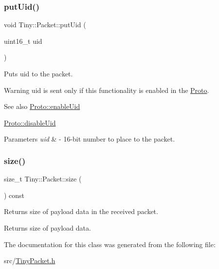 \subsubsection{\texorpdfstring{put\+Uid()}{putUid()}}
{\footnotesize\ttfamily void Tiny\+::\+Packet\+::put\+Uid (\begin{DoxyParamCaption}\item[{uint16\+\_\+t}]{uid }\end{DoxyParamCaption})\hspace{0.3cm}{\ttfamily [inline]}}

Puts uid to the packet. \begin{DoxyWarning}{Warning}
uid is sent only if this functionality is enabled in the \hyperlink{classTiny_1_1Proto}{Proto}. 
\end{DoxyWarning}
\begin{DoxySeeAlso}{See also}
\hyperlink{classTiny_1_1Proto_a9fdd64b8296e27f3205cd0d3ea685eac}{Proto\+::enable\+Uid} 

\hyperlink{classTiny_1_1Proto_aff9f3c59f58a8ca527ad0254ab806c5c}{Proto\+::disable\+Uid} 
\end{DoxySeeAlso}

\begin{DoxyParams}{Parameters}
{\em uid} & -\/ 16-\/bit number to place to the packet. \\
\hline
\end{DoxyParams}
\mbox{\label{classTiny_1_1Packet_a47c24d500159d2268908b10c407d8d4d}} 
\subsubsection{\texorpdfstring{size()}{size()}}
{\footnotesize\ttfamily size\+\_\+t Tiny\+::\+Packet\+::size (\begin{DoxyParamCaption}{ }\end{DoxyParamCaption}) const\hspace{0.3cm}{\ttfamily [inline]}}

Returns size of payload data in the received packet. \begin{DoxyReturn}{Returns}
size of payload data. 
\end{DoxyReturn}


The documentation for this class was generated from the following file\+:\begin{DoxyCompactItemize}
\item 
src/\hyperlink{TinyPacket_8h}{Tiny\+Packet.\+h}\end{DoxyCompactItemize}
